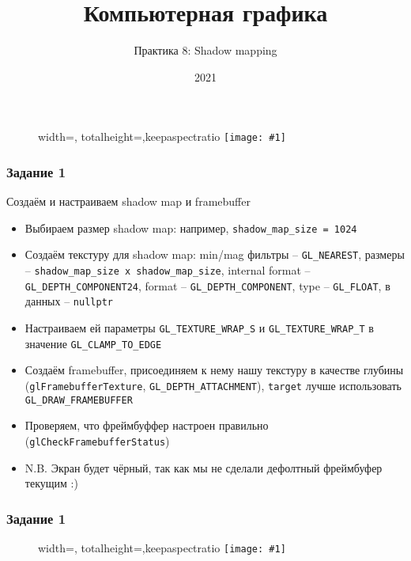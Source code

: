 \documentclass{beamer}
\title{Компьютерная графика}
\subtitle{Практика 8: Shadow mapping}
\date{2021}
\newcommand{\slideimage}[1]{
  \begin{figure}
    \begin{adjustbox}{width=\textwidth, totalheight=\textheight-2\baselineskip-2\baselineskip,keepaspectratio}
      \texttt{[image: \#1]}
    \end{adjustbox}
  \end{figure}
}
\begin{document}
\frame{\titlepage}

\begin{frame}[fragile]
\slideimage{0.png}
\end{frame}

\begin{frame}[fragile]
\frametitle{Задание 1}
\fontsize{10pt}{10pt}
Создаём и настраиваем shadow map и framebuffer
\begin{itemize}
\item Выбираем размер shadow map: например, \verb|shadow_map_size = 1024|
\item Создаём текстуру для shadow map: min/mag фильтры -- \verb|GL_NEAREST|, размеры -- \verb|shadow_map_size x shadow_map_size|, internal format -- \verb|GL_DEPTH_COMPONENT24|, format -- \verb|GL_DEPTH_COMPONENT|, type -- \verb|GL_FLOAT|, в данных -- \verb|nullptr|
\item Настраиваем ей параметры \verb|GL_TEXTURE_WRAP_S| и \verb|GL_TEXTURE_WRAP_T| в значение \verb|GL_CLAMP_TO_EDGE|
\item Создаём framebuffer, присоединяем к нему нашу текстуру в качестве глубины (\verb|glFramebufferTexture|, \verb|GL_DEPTH_ATTACHMENT|), \verb|target| лучше использовать \verb|GL_DRAW_FRAMEBUFFER|
\item Проверяем, что фреймбуффер настроен правильно (\verb|glCheckFramebufferStatus|)
\item N.B. Экран будет чёрный, так как мы не сделали дефолтный фреймбуфер текущим :)
\end{itemize}
\end{frame}

\begin{frame}[fragile]
\frametitle{Задание 1}
\slideimage{1.png}
\end{frame}
\end{document}
